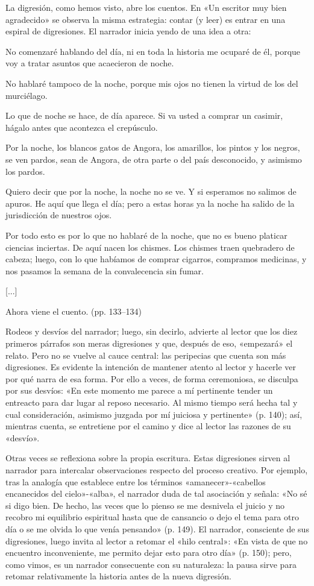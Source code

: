 \documentclass[14pt,twoside,final]{extbook} %
\begin{document}
La digresión, como hemos visto, abre los cuentos. En «Un escritor muy bien agradecido» se observa la misma estrategia: contar (y leer) es entrar en una espiral de digresiones. El narrador inicia yendo de una idea a otra:
\begin{quoting}
No comenzaré hablando del día, ni en toda la historia me ocuparé de él, porque voy a tratar asuntos que acaecieron de noche.

No hablaré tampoco de la noche, porque mis ojos no tienen la virtud de los del murciélago.

Lo que de noche se hace, de día aparece. Si va usted a comprar un casimir, hágalo antes que acontezca el crepúsculo.

Por la noche, los blancos gatos de Angora, los amarillos, los pintos y los negros, se ven pardos, sean de Angora, de otra parte o del país desconocido, y asimismo los pardos.

Quiero decir que por la noche, la noche no se ve. Y si esperamos no salimos de apuros. He aquí que llega el día; pero a estas horas ya la noche ha salido de la jurisdicción de nuestros ojos.

Por todo esto es por lo que no hablaré de la noche, que no es bueno platicar ciencias inciertas. De aquí nacen los chismes. Los chismes traen quebradero de cabeza; luego, con lo que habíamos de comprar cigarros, compramos medicinas, y nos pasamos la semana de la convalecencia sin fumar. 

\centerline{[...]}

Ahora viene el cuento. (pp. 133--134)
\end{quoting}
Rodeos y desvíos del narrador; luego, sin decirlo, advierte al lector que los diez primeros párrafos son meras digresiones y que, después de eso, «empezará» el relato. Pero no se vuelve al cauce central: las peripecias que cuenta son más digresiones. Es evidente la intención de mantener
atento al lector y hacerle ver por qué narra de esa forma. Por ello a veces, de forma ceremoniosa, se
disculpa por sus desvíos: «En este momento me parece a mí pertinente tender un entreacto para dar lugar al reposo necesario. Al mismo tiempo será hecha tal y cual consideración, asimismo juzgada por mí juiciosa y pertinente» (p. 140); así, mientras cuenta, se entretiene por el camino y dice al lector las razones de su «desvío».

Otras veces se reflexiona sobre la propia escritura. Estas digresiones sirven al narrador para intercalar observaciones respecto del proceso creativo. Por ejemplo, tras la analogía que establece entre los términos «amanecer»-«cabellos encanecidos del cielo»-«alba», el narrador duda de tal asociación y señala: «No sé si digo bien. De hecho, las veces que lo pienso se me desnivela el juicio y no recobro mi equilibrio espiritual hasta que de cansancio o dejo el tema para otro día o se me olvida lo que venía pensando» (p. 149). El narrador, consciente de sus digresiones, luego invita al lector a retomar el «hilo central»: «En vista de que no encuentro inconveniente, me permito dejar esto para otro día» (p. 150); pero, como vimos, es un narrador consecuente con su naturaleza: la pausa sirve para retomar relativamente la historia antes de la nueva digresión.
\end{document}

